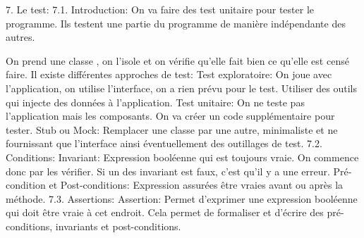 7. Le test:
7.1. Introduction:
On va faire des test unitaire pour tester le programme. Ils testent une partie du programme de manière indépendante des autres.

On prend une classe , on l’isole et on vérifie qu’elle fait bien ce qu’elle est censé faire.
Il existe différentes approches de test:
Test exploratoire: On joue avec l’application, on utilise l’interface, on a rien prévu pour le test.
Utiliser des outils qui injecte des données à l’application.
Test unitaire: On ne teste pas l’application mais les composants. On va créer un code supplémentaire pour tester.
Stub ou Mock: Remplacer une classe par une autre, minimaliste et ne fournissant que l’interface ainsi éventuellement des outillages de test.
7.2. Conditions:
Invariant: Expression booléenne qui est toujours vraie. On commence donc par les vérifier. Si un des invariant est faux, c’est qu’il y a une erreur.
Pré-condition et Post-conditions: Expression assurées être vraies avant ou après la méthode.
7.3. Assertions:
Assertion: Permet d’exprimer une expression booléenne qui doit être vraie à cet endroit.
Cela permet de formaliser et d’écrire des pré-conditions, invariants et post-conditions.

